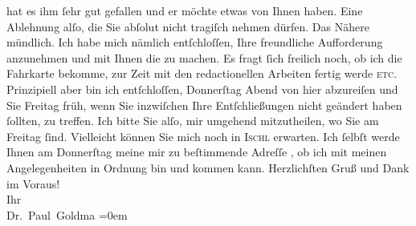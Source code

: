 \begin{ledgroupsized}[t]{13cm}
               hat es ihm ſehr gut gefallen und er möchte etwas \label{K_L02642-1v}\label{K_L02642-1h} von Ihnen haben. Eine Ablehnung alſo, die Sie abſolut {\pb}nicht tragiſch nehmen dürfen. Das
               Nähere mündlich.\pend
           \pstart
           Ich habe mich nämlich entſchloſſen, Ihre freundliche Aufforderung anzunehmen und mit
               Ihnen die \label{K_L02642-2v}\label{K_L02642-2h} zu machen. Es fragt ſich freilich noch,
               ob ich die Fahrkarte bekomme, zur Zeit mit den redactionellen Arbeiten fertig werde
                  \textsc{etc}. Prinzipiell aber bin ich entſchloſſen, Donnerſtag{ }Abend von hier
               abzureiſen und Sie Freitag{ }früh, wenn Sie inzwiſchen Ihre Entſchließungen nicht geändert haben
               ſollten, \label{K_L02642-4v}\label{K_L02642-4h} zu treffen. Ich bitte Sie
               alſo, mir umgehend mitzutheilen, wo Sie am Freitag
               ſind. {\pb}Vielleicht können Sie mich
               noch in \textsc{Ischl} erwarten. Ich ſelbſt werde Ihnen am Donnerſtag
               meine mir zu beſtimmende Adreſſe \label{K_L02642-3v}\label{K_L02642-3h}, ob ich mit meinen Angelegenheiten in Ordnung bin und kommen
               kann.\pend
           \pstart
           Herzlichſten Gruß und Dank im Voraus! {\\[\baselineskip]}Ihr {\\[\baselineskip]}\spacefill\mbox{Dr. Paul Goldma{\geminationn}}\pend
           \leftskip=0em{}          \endnumbering{}\end{ledgroupsized}  \newcommand{\dateiname}{L02642}\newcommand{\titel}{Paul Goldmann an Arthur Schnitzler, 4. 8. 1889}\newcommand{\editorInnen}{Martin Anton Müller und Laura Untner}
            \footnotesize
\begin{ledgroupsized}[t]{11.5cm}
\end{ledgroupsized}
         
      